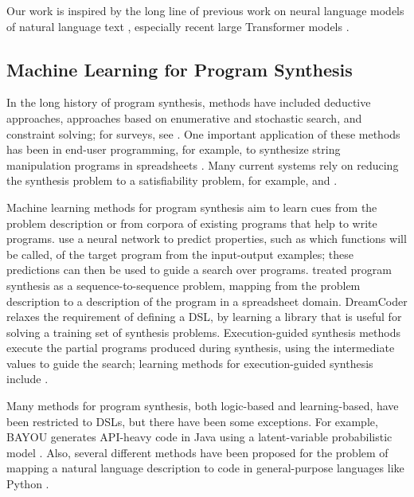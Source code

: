 Our work is inspired by the long line of previous work on neural language models of natural language text \citep{mikolov2010recurrent,sutskever2011generating,JozefowiczVSSW16,dai2015semi,peters-etal-2018-deep,howard-ruder-2018-universal}, especially recent large Transformer models \citep{radford2018improving,GPT3}. 

\subsection{Machine Learning for Program Synthesis}

In the long history of program synthesis, methods have included deductive approaches, approaches based on enumerative and stochastic search, and constraint solving; for surveys, see \cite{RISHABHSURVEY,ARMANDOCOURSE}. One important application of these methods has been in end-user programming, for example, to synthesize string manipulation programs in spreadsheets \citep{FLASHFILL}. Many current systems rely on reducing the synthesis problem to a satisfiability problem, for example, \cite{SKETCH} and \cite{ROSETTE}.

Machine learning methods for program synthesis aim to learn cues from the problem description or from corpora of existing programs that help to write programs. \cite{DEEPCODER} use a neural network to predict properties, such as which functions will be called, of the target program from the input-output examples; these predictions can then be used to guide a search over programs. \cite{ROBUSTFILL} treated program synthesis as a sequence-to-sequence problem, mapping from the problem description to a description of the program in a spreadsheet domain. DreamCoder \citep{DREAMCODER} relaxes the requirement of defining a DSL, by learning a library that is useful for solving a training set of synthesis problems. Execution-guided synthesis methods execute the partial programs produced during synthesis, using the intermediate values to guide the search; learning methods for execution-guided synthesis include \cite{GARBAGECOLLECTOR,ChenLS19,REPL,BUSTLE}.

Many methods for program synthesis, both logic-based and learning-based, have been restricted to DSLs, but there have been some exceptions. For example, BAYOU generates API-heavy code in Java using a latent-variable probabilistic model \citep{BAYOU}. Also, several different methods have been proposed for the problem of mapping a natural language description to code in general-purpose languages like Python \citep{Ling2016-qd,Yin2017-my,Iyer2018-iu}.

